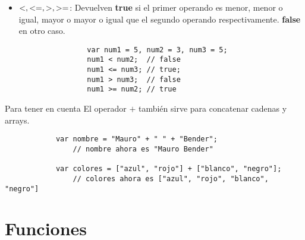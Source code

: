 \documentclass[handout, 10pt]{beamer}
\begin{document}
\begin{frame}[fragile]
	\begin{itemize}
		\pause \item $\boldmath{<, <=, >, >=}$: Devuelven \textbf{true} si el primer operando es menor, menor o igual, mayor o
		mayor o igual que el segundo operando respectivamente. \textbf{false} en otro caso.
			\begin{lstlisting}
				var num1 = 5, num2 = 3, num3 = 5;
				num1 < num2;  // false
				num1 <= num3; // true;
				num1 > num3;  // false
				num1 >= num2; // true
			\end{lstlisting}
	\end{itemize}
	
	\pause
	
	\begin{block}{Para tener en cuenta}
      El operador $+$ también sirve para concatenar cadenas y arrays.
      \begin{lstlisting}
			var nombre = "Mauro" + " " + "Bender";
				// nombre ahora es "Mauro Bender"
			
			var colores = ["azul", "rojo"] + ["blanco", "negro"];
				// colores ahora es ["azul", "rojo", "blanco", "negro"]
		\end{lstlisting}
   \end{block}
\end{frame}

\section{Funciones}
\end{document}
